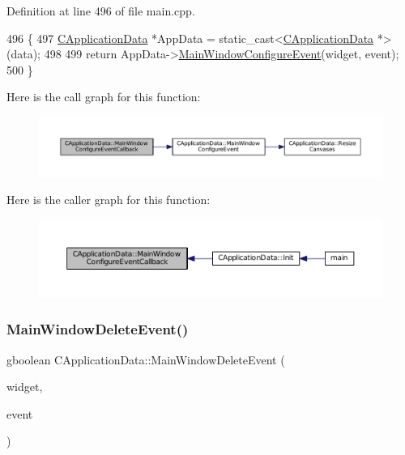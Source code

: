 Definition at line 496 of file main.\+cpp.


\begin{DoxyCode}
496                                                                                                            
       \{
497     \hyperlink{classCApplicationData}{CApplicationData} *AppData = \textcolor{keyword}{static\_cast<}\hyperlink{classCApplicationData}{CApplicationData} *\textcolor{keyword}{>}(data);
498 
499     \textcolor{keywordflow}{return} AppData->\hyperlink{classCApplicationData_a7abef8a548d0ad3adb70f11d8a74176c}{MainWindowConfigureEvent}(widget, event);
500 \}
\end{DoxyCode}
Here is the call graph for this function\+:
\nopagebreak
\begin{figure}[H]
\begin{center}
\leavevmode
\includegraphics[width=350pt]{classCApplicationData_a31b48405b43d73cabca4c080c1b9beee_cgraph}
\end{center}
\end{figure}
Here is the caller graph for this function\+:
\nopagebreak
\begin{figure}[H]
\begin{center}
\leavevmode
\includegraphics[width=350pt]{classCApplicationData_a31b48405b43d73cabca4c080c1b9beee_icgraph}
\end{center}
\end{figure}
\hypertarget{classCApplicationData_afd73780d7dca117edbe341cb3c908c04}{}\label{classCApplicationData_afd73780d7dca117edbe341cb3c908c04} 
\subsubsection{\texorpdfstring{Main\+Window\+Delete\+Event()}{MainWindowDeleteEvent()}}
{\footnotesize\ttfamily gboolean C\+Application\+Data\+::\+Main\+Window\+Delete\+Event (\begin{DoxyParamCaption}\item[{Gtk\+Widget $\ast$}]{widget,  }\item[{Gdk\+Event $\ast$}]{event }\end{DoxyParamCaption})\hspace{0.3cm}{\ttfamily [protected]}}



